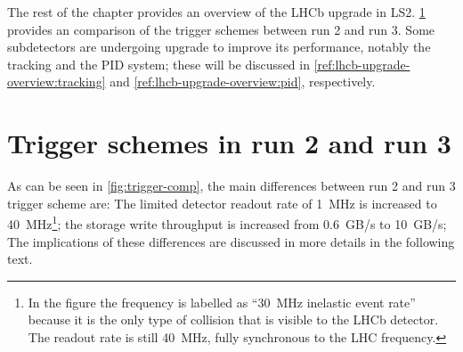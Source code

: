 The rest of the chapter provides an overview of the LHCb upgrade in LS2.
\cref{ref:lhcb-upgrade-overview:trigger}
provides an comparison of the trigger schemes between run 2 and run 3.
Some subdetectors are undergoing upgrade to improve its performance, notably
the tracking and the PID system;
these will be discussed in \cref{ref:lhcb-upgrade-overview:tracking} and
\cref{ref:lhcb-upgrade-overview:pid}, respectively.


\section{Trigger schemes in run 2 and run 3}
\label{ref:lhcb-upgrade-overview:trigger}

As can be seen in \cref{fig:trigger-comp},
the main differences between run 2 and run 3 trigger scheme are:
The limited detector readout rate of 1~MHz is increased to 40~MHz\footnote{
    In the figure the frequency is labelled as ``30~MHz inelastic event rate''
    because it is the only type of collision that is visible to the LHCb
    detector.
    The readout rate is still 40~MHz, fully synchronous to the LHC frequency.
};
the storage write throughput is increased from 0.6~GB/s to 10~GB/s;
The implications of these differences are discussed in more details in the
following text.

